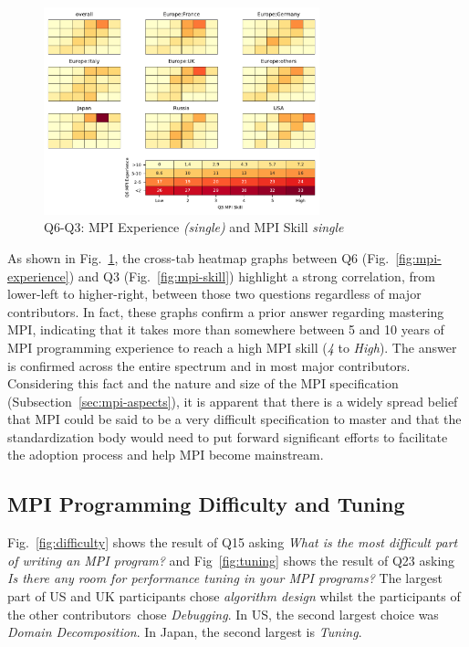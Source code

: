 \documentclass[preprint,5p,times]{elsarticle}
\def\myquote#1{{\it #1}}
\newcommand{\revision}[2]{{\color{blue}#2}}
\def\countries{contributors\xspace{}}%
\def\mcountries{major contributors\xspace{}}%
\begin{document}
\begin{figure}[tb]
\begin{center}
\includegraphics[width=8.0cm]{Figs/Q6-Q3.pdf}
\vspace{-1.5mm}
\caption{Q6-Q3: MPI Experience {\it(single)} and MPI Skill {\it single}}
\label{fig:experience-and-skill}
\vspace{-3mm}%
\end{center}
\end{figure}

As shown in Fig.~\ref{fig:experience-and-skill}, the cross-tab heatmap graphs
between Q6 (Fig.~\ref{fig:mpi-experience}) and Q3 \revision{(Fig.~\ref{fig:mpi-skill}),}{(Fig.~\ref{fig:mpi-skill})}
highlight a strong correlation, from lower-left to higher-right, between those
two questions regardless of \mcountries. In fact, these graphs confirm a prior
answer regarding mastering MPI, indicating that it takes more than somewhere
between 5 and 10 years of MPI programming experience to reach a high MPI skill
(\myquote{4} to \myquote{High}). The answer is confirmed across the entire
spectrum and in most \mcountries.
Considering this fact and the nature and size of the MPI specification
(Subsection~\ref{sec:mpi-aspects}), it is apparent that there is a widely
spread belief that MPI could be said to be a very difficult specification to
master and that the standardization body would need to put forward significant
efforts to facilitate the adoption process and help MPI become mainstream.

\subsection{MPI Programming Difficulty and Tuning}

Fig.~\ref{fig:difficulty} shows the result of Q15 asking \myquote{What is the
most difficult part of writing an MPI program?} and
Fig~\ref{fig:tuning} shows the result of Q23 asking \myquote{Is there any
room for performance tuning in your MPI programs?} The largest part
of US and UK participants chose \myquote{algorithm design} whilst the
participants of the other \countries\ chose
\myquote{Debugging}. In US, the second largest choice was
\myquote{Domain Decomposition}. In Japan, the second largest is
\myquote{Tuning}.
\end{document}
